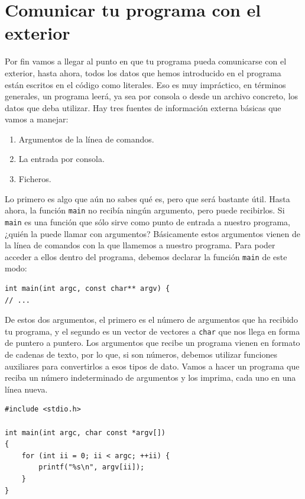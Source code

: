 \documentclass[a4paper]{article}
\begin{document}
\section{Comunicar tu programa con el exterior}
Por fin vamos a llegar al punto en que tu programa pueda comunicarse con el
exterior, hasta ahora, todos los datos que hemos introducido en el programa
están escritos en el código como literales. Eso es muy impráctico, en términos
generales, un programa leerá, ya sea por consola o desde un archivo concreto,
los datos que deba utilizar. Hay tres fuentes de información externa
básicas que vamos a manejar:
\begin{enumerate}
\item Argumentos de la línea de comandos.
\item La entrada por consola.
\item Ficheros.
\end{enumerate}

Lo primero es algo que aún no sabes qué es, pero que será bastante útil. Hasta
ahora, la función \verb!main! no recibía ningún argumento, pero puede
recibirlos. Si \verb!main! es una función que sólo sirve como punto de entrada
a nuestro programa, ¿quién la puede llamar con argumentos? Básicamente
estos argumentos vienen de la línea de comandos con la que llamemos a nuestro
programa. Para poder acceder a ellos dentro del programa, debemos declarar
la función \verb!main! de este modo:

\noindent
\begin{minipage}[H]{\linewidth}
\mbox{}
\begin{lstlisting}[style=C,
caption={Declaración de una función \texttt{main} que reciba argumentos},
label={lst:mainArguments}]
int main(int argc, const char** argv) {
// ...
\end{lstlisting}
\end{minipage}

De estos dos argumentos, el primero es el número de argumentos que ha recibido
tu programa, y el segundo es un vector de vectores a \verb!char! que nos llega
en forma de puntero a puntero. Los argumentos que recibe un programa vienen
en formato de cadenas de texto, por lo que, si son números, debemos utilizar
funciones auxiliares para convertirlos a esos tipos de dato. Vamos a hacer
un programa que reciba un número indeterminado de argumentos y los imprima, cada
uno en una línea nueva.

\noindent
\begin{minipage}[H]{\linewidth}
\mbox{}
\begin{lstlisting}[style=C,
caption={Utilización de los argumentos de un programa},
label={lst:argumentProgram}]
#include <stdio.h>

int main(int argc, char const *argv[])
{
    for (int ii = 0; ii < argc; ++ii) {
        printf("%s\n", argv[ii]);
    }
}
\end{lstlisting}
\end{minipage}
\end{document}
